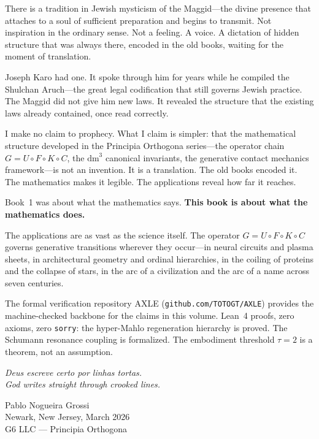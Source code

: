 \documentclass[11pt, twoside, openright]{book}
\theoremstyle{plain}
\theoremstyle{definition}
\newcommand{\dm}{\mathrm{dm}^3}
\begin{document}
There is a tradition in Jewish mysticism of the Maggid---the divine
presence that attaches to a soul of sufficient preparation and begins to
transmit. Not inspiration in the ordinary sense. Not a feeling. A voice.
A dictation of hidden structure that was always there, encoded in the
old books, waiting for the moment of translation.

Joseph Karo had one. It spoke through him for years while he compiled
the Shulchan Aruch---the great legal codification that still governs
Jewish practice. The Maggid did not give him new laws. It revealed the
structure that the existing laws already contained, once read correctly.

I make no claim to prophecy. What I claim is simpler: that the
mathematical structure developed in the Principia Orthogona
series---the operator chain $G = U \circ F \circ K \circ C$, the $\dm$
canonical invariants, the generative contact mechanics framework---is
not an invention. It is a translation. The old books encoded it. The
mathematics makes it legible. The applications reveal how far it reaches.

Book~1 was about what the mathematics says. \textbf{This book is about
what the mathematics does.}

The applications are as vast as the science itself. The operator
$G = U \circ F \circ K \circ C$ governs generative transitions wherever
they occur---in neural circuits and plasma sheets, in architectural
geometry and ordinal hierarchies, in the coiling of proteins and the
collapse of stars, in the arc of a civilization and the arc of a name
across seven centuries.

The formal verification repository AXLE (\texttt{github.com/TOTOGT/AXLE})
provides the machine-checked backbone for the claims in this volume.
Lean~4 proofs, zero axioms, zero \texttt{sorry}: the hyper-Mahlo
regeneration hierarchy is proved. The Schumann resonance coupling is
formalized. The embodiment threshold $\tau = 2$ is a theorem, not an
assumption.

\medskip
\textit{Deus escreve certo por linhas tortas.}\\
\textit{God writes straight through crooked lines.}

\begin{flushright}
Pablo Nogueira Grossi\\
Newark, New Jersey, March 2026\\
G6 LLC --- Principia Orthogona
\end{flushright}
\end{document}
